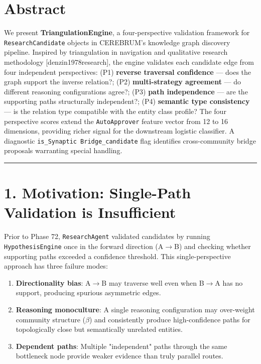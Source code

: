 
\section*{Abstract}

We present \textbf{TriangulationEngine}, a four-perspective validation framework for \texttt{ResearchCandidate} objects in CEREBRUM's knowledge graph discovery pipeline. Inspired by triangulation in navigation and qualitative research methodology [denzin1978research], the engine validates each candidate edge from four independent perspectives: (P1) \textbf{reverse traversal confidence} --- does the graph support the inverse relation?; (P2) \textbf{multi-strategy agreement} --- do different reasoning configurations agree?; (P3) \textbf{path independence} --- are the supporting paths structurally independent?; (P4) \textbf{semantic type consistency} --- is the relation type compatible with the entity class profile? The four perspective scores extend the \texttt{AutoApprover} feature vector from 12 to 16 dimensions, providing richer signal for the downstream logistic classifier. A diagnostic \texttt{is\_Synaptic Bridge\_candidate} flag identifies cross-community bridge proposals warranting special handling.

\medskip\noindent\rule{\linewidth}{0.4pt}\medskip

\section*{1. Motivation: Single-Path Validation is Insufficient}

Prior to Phase 72, \texttt{ResearchAgent} validated candidates by running \texttt{HypothesisEngine} once in the forward direction (A$\to$B) and checking whether supporting paths exceeded a confidence threshold. This single-perspective approach has three failure modes:

\begin{enumerate}
  \item \textbf{Directionality bias}: A$\to$B may traverse well even when B$\to$A has no support, producing spurious asymmetric edges.
  \item \textbf{Reasoning monoculture}: A single reasoning configuration may over-weight community structure ($\beta$) and consistently produce high-confidence paths for topologically close but semantically unrelated entities.
  \item \textbf{Dependent paths}: Multiple "independent" paths through the same bottleneck node provide weaker evidence than truly parallel routes.
\end{enumerate}


